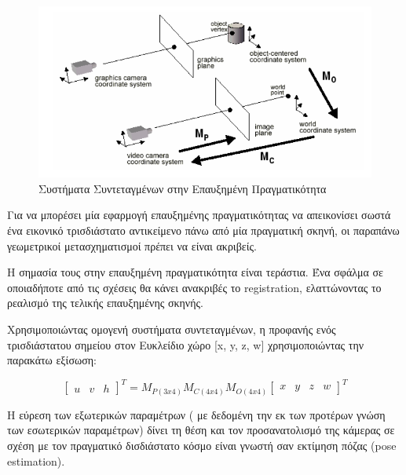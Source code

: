 \begin{figure}[H]
    \centering
    \includegraphics[scale=1.3, angle=0]{Files/Figures/coordinatesystems.png}
    \caption[Συστήματα Συντεταγμένων στην Επαυξημένη Πραγματικότητα]{Συστήματα Συντεταγμένων στην Επαυξημένη Πραγματικότητα}
    \label{fig:coordinatesystems}
\end{figure}

Για να μπορέσει μία εφαρμογή επαυξημένης πραγματικότητας να απεικονίσει σωστά ένα εικονικό τρισδιάστατο αντικείμενο πάνω από μία πραγματική σκηνή, οι παραπάνω γεωμετρικοί μετασχηματισμοί πρέπει να είναι ακριβείς.

H σημασία τους στην επαυξημένη πραγματικότητα είναι τεράστια.
Ένα σφάλμα σε οποιαδήποτε από τις σχέσεις θα κάνει ανακριβές το registration, ελαττώνοντας το ρεαλισμό της τελικής επαυξημένης σκηνής. 

Χρησιμοποιώντας ομογενή συστήματα συντεταγμένων, η προφανής ενός τρισδιάστατου σημείου στον Ευκλείδιο χώρο [x, y, z, w] χρησιμοποιώντας την παρακάτω εξίσωση:

\begin{equation}
\begin{bmatrix}
u & v & h
\end{bmatrix}
^{T}=
M_{P(3x4)}M_{C(4x4)}M_{O(4x4)}
\begin{bmatrix}
x & y & z & w
\end{bmatrix}
^{T}
\end{equation}






Η εύρεση των εξωτερικών παραμέτρων ( με δεδομένη την εκ των προτέρων γνώση των εσωτερικών παραμέτρων) δίνει τη θέση και τον προσανατολισμό της κάμερας σε σχέση με τον πραγματικό δισδιάστατο κόσμο είναι γνωστή σαν εκτίμηση πόζας (pose estimation).




